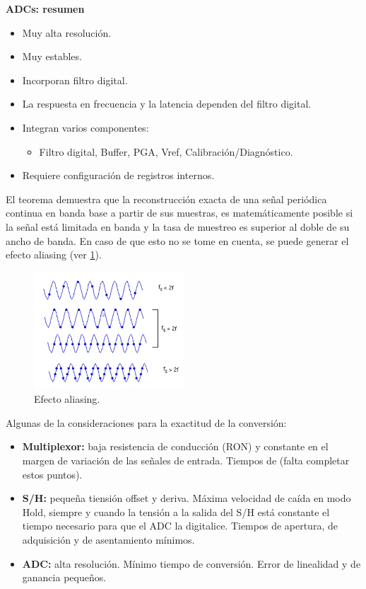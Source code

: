 \documentclass[12pt, letterpaper]{extarticle}
\begin{document}
\noindent
\textbf{ADCs: resumen}

\begin{itemize}
    \item Muy alta resolución.
    \item Muy estables.
    \item Incorporan filtro digital.
    \item La respuesta en frecuencia y la latencia dependen del filtro digital.
    \item Integran varios componentes:
    \begin{itemize}
        \item Filtro digital, Buffer, PGA, Vref, Calibración/Diagnóstico.
    \end{itemize}
    \item Requiere configuración de registros internos.
\end{itemize}


El teorema demuestra que la reconstrucción exacta de una señal periódica continua en banda base a partir de sus muestras, es matemáticamente posible si la señal está limitada en banda y la tasa de muestreo es superior al doble de su ancho de banda. En caso de que esto no se tome en cuenta, se puede generar el efecto aliasing (ver \cref{Fig: Efecto aliasing}).

\begin{figure}[ht]
    \centering
    \includegraphics[width=0.5\textwidth]{Media/efecto_aliasing.png}
    \caption{Efecto aliasing.}
    \label{Fig: Efecto aliasing}
\end{figure}

Algunas de la consideraciones para la exactitud de la conversión:
\begin{itemize}
    \item \textbf{Multiplexor:} baja resistencia de conducción (RON) y constante en el margen de variación de las señales de entrada. Tiempos de (falta completar estos puntos).
    \item \textbf{S/H:} pequeña tiensión offset y deriva. Máxima velocidad de caída en modo Hold, siempre y cuando la tensión a la salida del S/H está constante el tiempo necesario para que el ADC la digitalice. Tiempos de apertura, de adquisición y de asentamiento mínimos.
    \item \textbf{ADC:} alta resolución. Mínimo tiempo de conversión. Error de linealidad y de ganancia pequeños.
\end{itemize}
\end{document}
